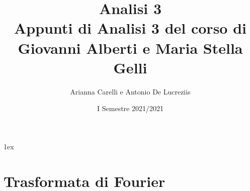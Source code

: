 \documentclass[a4paper, 12pt]{report}
\title{{\Huge Analisi 3}\\{\small Appunti di Analisi 3 del corso di Giovanni Alberti e Maria Stella Gelli}}
\author{Arianna Carelli e Antonio De Lucreziis}
\date{I Semestre 2021/2021}
\begin{document}
%
%
\parskip 1ex
\setlength{\parindent}{0pt}

\maketitle

\tableofcontents

\newpage











































\chapter{Trasformata di Fourier}
\end{document}
